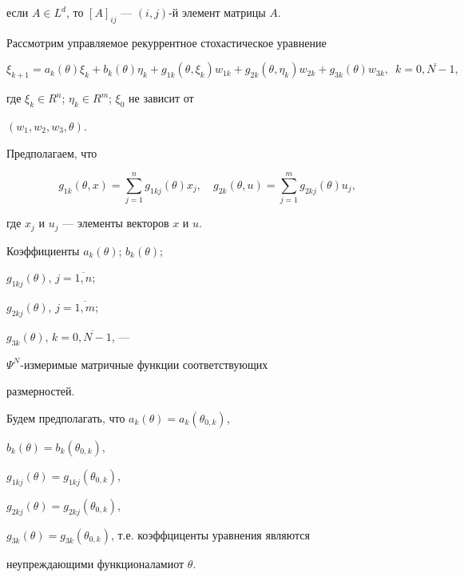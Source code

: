если $A\in L^{d}$, то $[A]_{ij}$ --- $(i,j)$-й элемент матрицы $A$.





Рассмотрим управляемое рекуррентное стохастическое уравнение


\begin{equation}


\xi_{k+1}=a_{k}(\theta)\xi_{k}+b_{k}(\theta)\eta_{k}


+g_{1k}(\theta,\xi_{k})w_{1k}+


g_{2k}(\theta,\eta_{k})w_{2k}+ g_{3k}(\theta)w_{3k},\ \;


k=\overline{0,N-1},


\end{equation}


где $\xi_{k}\in R^{n}$; $\eta_{k}\in R^{m}$; $\xi_{0}$ не зависит от


$(w_{1},w_{2},w_{3},\theta)$.





Предполагаем, что


$$


g_{1k}(\theta,x)=\sum_{j=1}^{n}g_{1kj}(\theta)x_{j},\quad


g_{2k}(\theta,u)=\sum_{j=1}^{m}g_{2kj}(\theta)u_{j},


$$


где $x_{j}$ и $u_{j}$ --- элементы векторов $x$ и $u$.


Коэффициенты $a_{k}(\theta)$; $b_{k}(\theta)$;


$g_{1kj}(\theta)$, $j=\overline{1,n}$;


$g_{2kj}(\theta)$, $j=\overline{1,m}$;


$g_{3k}(\theta)$, $k=\overline{0,N-1}$, --- 


$\Psi^{N}$-измеримые матричные функции соответствующих


размерностей.


Будем предполагать, что $a_{k}(\theta)=a_{k}(\theta_{0,k})$,


$b_{k}(\theta)=b_{k}(\theta_{0,k})$,


$g_{1kj}(\theta)=g_{1kj}(\theta_{0,k})$,


$g_{2kj}(\theta)=g_{2kj}(\theta_{0,k})$,


$g_{3k}(\theta)=g_{3k}(\theta_{0,k})$, т.е. коэффциценты уравнения являются


неупреждающими функционалами\linebreak от $\theta$.





